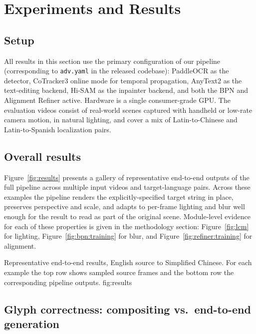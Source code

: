 \section{Experiments and Results}
\label{sec:experiments}

\subsection{Setup}
\label{sec:exp:setup}

All results in this section use the primary configuration of our
pipeline (corresponding to \texttt{adv.yaml} in the released
codebase): PaddleOCR as the detector, CoTracker3 online mode for
temporal propagation, AnyText2 as the text-editing backend, Hi-SAM
as the inpainter backend, and both the BPN and Alignment Refiner
active. Hardware is a single consumer-grade GPU. The evaluation
videos consist of real-world scenes captured with handheld or
low-rate camera motion, in natural lighting, and cover a mix of
Latin-to-Chinese and Latin-to-Spanish localization pairs.

\subsection{Overall results}
\label{sec:exp:overall}

Figure~\ref{fig:results} presents a gallery of representative
end-to-end outputs of the full pipeline across multiple input
videos and target-language pairs. Across these examples the
pipeline renders the explicitly-specified target string in place,
preserves perspective and scale, and adapts to per-frame lighting
and blur well enough for the result to read as part of the
original scene.
Module-level evidence for each of these properties is given in the
methodology section: Figure~\ref{fig:lcm} for lighting,
Figure~\ref{fig:bpn:training} for blur, and
Figure~\ref{fig:refiner:training} for alignment.

%
  {Representative end-to-end results, English source to Simplified
   Chinese. For each example the top row shows sampled source
   frames and the bottom row the corresponding pipeline outputs.}%
  {fig:results}

\subsection{Glyph correctness: compositing vs.\ end-to-end generation}
\label{sec:exp:glyph}

